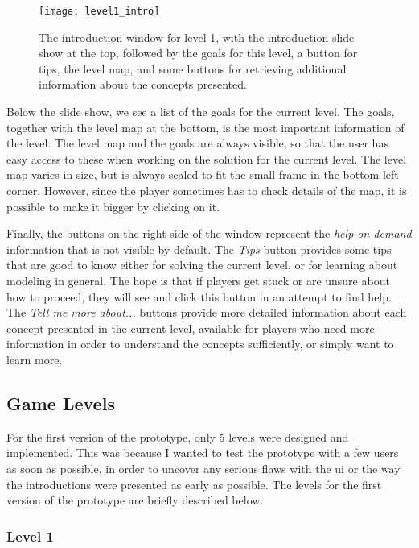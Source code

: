 \begin{figure}[htp]
	\centering
	\texttt{[image: level1\_intro]}
	\caption[Introduction window for level 1]{The introduction window for level 1, with the introduction slide show at the top, followed by the goals for this level, a button for tips, the level map, and some buttons for retrieving additional information about the concepts presented.}
	\label{fig:level1_intro}
\end{figure}

\noindent
Below the slide show, we see a list of the goals for the current level. The goals, together with the level map at the bottom, is the most important information of the level. The level map and the goals are always visible, so that the user has easy access to these when working on the solution for the current level. The level map varies in size, but is always scaled to fit the small frame in the bottom left corner. However, since the player sometimes has to check details of the map, it is possible to make it bigger by clicking on it.

\noindent
Finally, the buttons on the right side of the window represent the \emph{help-on-demand} information that is not visible by default. The \emph{Tips} button provides some tips that are good to know either for solving the current level, or for learning about modeling in general. The hope is that if players get stuck or are unsure about how to proceed, they will see and click this button in an attempt to find help. The \emph{Tell me more about...} buttons provide more detailed information about each concept presented in the current level, available for players who need more information in order to understand the concepts sufficiently, or simply want to learn more.

\noindent





\subsection{Game Levels}
\label{sec:game_levels}
For the first version of the prototype, only 5 levels were designed and implemented. This was because I wanted to test the prototype with a few users as soon as possible, in order to uncover any serious flaws with the \gls{ui} or the way the introductions were presented as early as possible. The levels for the first version of the prototype are briefly described below.

\subsubsection{Level 1}


